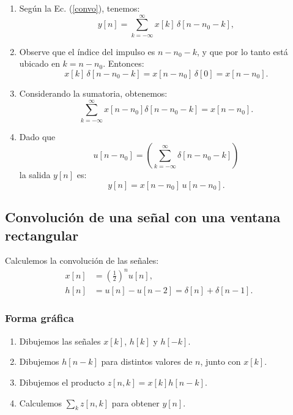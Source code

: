 \documentclass[11pt,a4paper,openany]{book}
\begin{document}
\begin{enumerate}
	\item Según la Ec. (\ref{convo}), tenemos:
	\begin{equation}
		y[n] = \sum_{k=-\infty}^{\infty} x[k] \, \delta[n-n_{0}-k],
	\end{equation}
	
	\item Observe que el índice del impulso es $n - n_{0} - k$, y que por lo tanto está ubicado en $k = n - n_{0}$. Entonces:
	\begin{equation}
		x[k] \, \delta[n-n_{0}-k] = x[n-n_{0}] \, \delta[0] = x[n-n_{0}].
	\end{equation}
	
	\item Considerando la sumatoria, obtenemos:
	\begin{equation}
		\sum_{k=-\infty}^{\infty} x[n-n_{0}] \delta[n-n_{0}-k] = x[n-n_{0}].
	\end{equation}
	
	\item Dado que
	\begin{equation}
		u[n-n_{0}] = \left( \sum_{k=-\infty}^{\infty} \delta[n-n_{0}-k] \right)
	\end{equation}
	la salida $y[n]$ es:
	\begin{equation}
		y[n] = x[n-n_{0}] \, u[n-n_{0}].
	\end{equation}
\end{enumerate}

\subsection{Convolución de una señal con una ventana rectangular}

Calculemos la convolución de las señales:
\begin{align}
	x[n] &= \left( \frac{1}{2}\right)^n u[n], \\
	h[n] &= u[n] - u[n-2] = \delta[n] + \delta[n-1].
\end{align}

\subsubsection{Forma gráfica}

\begin{enumerate}
	\item Dibujemos las señales $x[k]$, $h[k]$ y $h[-k]$.
	\item Dibujemos $h[n-k]$ para distintos valores de $n$, junto con $x[k]$.
	\item Dibujemos el producto $z[n,k] = x[k] h[n-k]$.
	\item Calculemos $\sum_{k}z[n,k]$ para obtener $y[n]$.
\end{enumerate}
\end{document}
